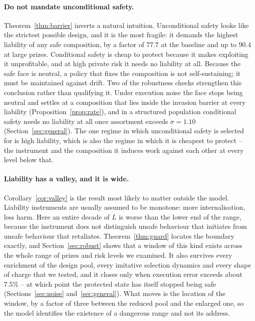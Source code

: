 \documentclass[11pt,a4paper]{article}
\theoremstyle{definition}
\begin{document}
\paragraph{Do not mandate unconditional safety.}
Theorem~\ref{thm:barrier} inverts a natural intuition. Unconditional safety
looks like the strictest possible design, and it is the most fragile: it
demands the highest liability of any safe composition, by a factor of $77.7$
at the baseline and up to $90.4$ at large prizes. Conditional safety is cheap to
protect because it makes exploiting it unprofitable, and at high private risk
it needs no liability at all. Because the safe face is neutral, a policy that
fixes the composition is not self-sustaining; it must be maintained against
drift. Two of the robustness checks strengthen this conclusion rather than
qualifying it. Under execution noise the face stops being neutral and settles
at a composition that lies inside the invasion barrier at every liability
(Proposition~\ref{prop:rate}), and in a structured population conditional
safety needs no liability at all once assortment exceeds $\sigma=1.10$
(Section~\ref{sec:general}). The one regime in which unconditional safety is
selected for is high liability, which is also the regime in which it is
cheapest to protect -- the instrument and the composition it induces work
against each other at every level below that.

\paragraph{Liability has a valley, and it is wide.}
Corollary~\ref{cor:valley} is the result most likely to matter outside the
model. Liability instruments are usually assumed to be monotone: more
internalisation, less harm. Here an entire decade of $L$ is worse than the
lower end of the range, because the instrument does not distinguish unsafe
behaviour that initiates from unsafe behaviour that retaliates.
Theorem~\ref{thm:guard} locates the boundary exactly, and
Section~\ref{sec:robust} shows that a window of this kind exists across the
whole range of prizes and risk levels we examined. It also survives every
enrichment of the design pool, every imitative selection dynamics and every
shape of charge that we tested, and it closes only when execution error
exceeds about $7.5\%$ -- at which point the protected state has itself stopped
being safe (Sections~\ref{sec:noise} and~\ref{sec:general}). What moves is the
location of the window, by a factor of three between the reduced pool and the
enlarged one, so the model identifies the existence of a dangerous range and
not its address.
\end{document}
